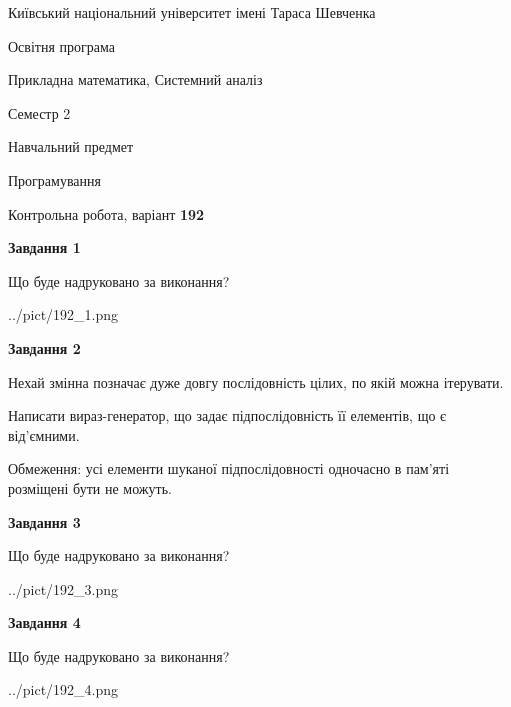 \documentclass[12pt, ukrainian]{article}
\begin{document}
{{\begin {small}\par
{ \center  Київський національний університет імені Тараса Шевченка \par}
{\parbox {5 cm}{Освітня програма \hfill}{\parbox {8 cm}{Прикладна математика, Системний аналіз \hfill}}\parbox {5 cm}{\hfill Семестр 2}}\par
{\parbox {5 cm} {Навчальний предмет \hfill}\parbox {7 cm}{Програмування \hfill}\parbox {6cm}{\hfill}\par}\vspace{-7pt} \end{small}}{\center Контрольна робота, варіант  \No \textbf
{ 192 }\par}}
{
\begin {large}
{\begin {center}\textbf{Завдання 1}\end {center}}\par
Що буде надруковано за виконання?\par\par
\begin{center}
	{../pict/192_1.png}
\end{center}
\newpage

{\begin {center}\textbf{Завдання 2}\end {center}}\par
Нехай змінна  позначає дуже довгу послідовність цілих, по якій можна ітерувати.

Написати вираз-генератор, що задає підпослідовність її елементів, що є від'єм\-ни\-ми.

Обмеження: усі елементи шуканої підпослідовності одночасно в пам'яті розміщені бути не можуть.\par
\newpage

{\begin {center}\textbf{Завдання 3}\end {center}}\par
Що буде надруковано за виконання?\par
\begin{center}
	{../pict/192_3.png}
\end{center}
\newpage

{\begin {center}\textbf{Завдання 4}\end {center}}\par
Що буде надруковано за виконання?\par
\begin{center}
	{../pict/192_4.png}
\end{center}
\newpage


\end{large}}
\end{document}
